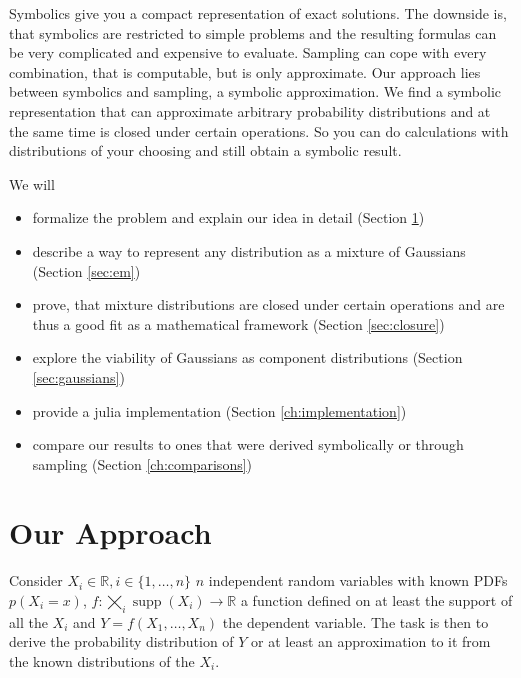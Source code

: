 \documentclass[11pt,a4paper]{book}
\DeclareMathOperator{\supp}{supp}
\begin{document}
Symbolics give you a compact representation of exact solutions. The downside is,
that symbolics are restricted to simple problems and the resulting formulas can
be very complicated and expensive to evaluate. Sampling can cope with every
combination, that is computable, but is only approximate. Our approach lies
between symbolics and sampling, a symbolic approximation. We find a symbolic
representation that can approximate arbitrary probability distributions and at
the same time is closed under certain operations. So you can do calculations
with distributions of your choosing and still obtain a symbolic result.

We will
\begin{itemize}
\item formalize the problem and explain our idea in detail (Section
  \ref{ch:idea})
\item describe a way to represent any distribution as a mixture of Gaussians
  (Section \ref{sec:em})
\item prove, that mixture distributions are closed under certain operations and
  are thus a good fit as a mathematical framework (Section \ref{sec:closure})
\item explore the viability of Gaussians as component distributions (Section
  \ref{sec:gaussians})
\item provide a julia implementation (Section \ref{ch:implementation})
\item compare our results to ones that were derived symbolically or through
  sampling (Section \ref{ch:comparisons})
\end{itemize}

\chapter{Our Approach}
\label{ch:idea}

Consider $X_{i} \in \mathbb{R}, i \in \{ 1, \dots, n \}$ $n$ independent random
variables with known PDFs $p(X_{i} = x)$,
$f : \bigtimes_{i} \supp(X_{i}) \rightarrow \mathbb{R}$ a function defined on at
least the support of all the $X_{i}$ and $Y = f(X_{1}, \dots, X_{n})$ the
dependent variable. The task is then to derive the probability distribution of
$Y$ or at least an approximation to it from the known distributions of the
$X_{i}$.
\end{document}
